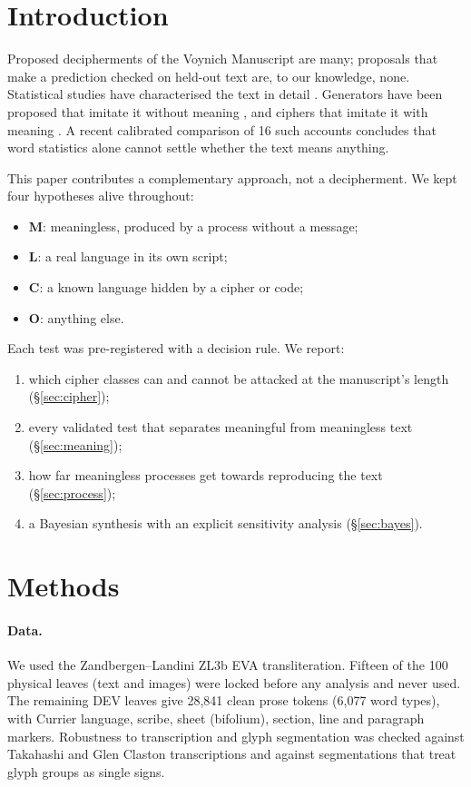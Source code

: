 \documentclass[11pt,a4paper]{article}
\begin{document}
\section{Introduction}
Proposed decipherments of the Voynich Manuscript are many; proposals that make a prediction checked on held-out text are, to our knowledge, none. Statistical studies have characterised the text in detail \citep{montemurro2013keywords,sterneck2021topic,gaskell2022gibberish,bowern2022enciphered,zattera2022slot,rozanova2026units,parisel2026currier,parisel2026layered}. Generators have been proposed that imitate it without meaning \citep{timm2019generating,quimqu2026scribe}, and ciphers that imitate it with meaning \citep{greshko2025naibbe,hermes2022polygraphia}. A recent calibrated comparison of 16 such accounts \citep{zhang2026voynich} concludes that word statistics alone cannot settle whether the text means anything.

This paper contributes a complementary approach, not a decipherment. We kept four hypotheses alive throughout:
\begin{itemize}
\item \textbf{M}: meaningless, produced by a process without a message;
\item \textbf{L}: a real language in its own script;
\item \textbf{C}: a known language hidden by a cipher or code;
\item \textbf{O}: anything else.
\end{itemize}
Each test was pre-registered with a decision rule. We report:
\begin{enumerate}
\item which cipher classes can and cannot be attacked at the manuscript's length (\S\ref{sec:cipher});
\item every validated test that separates meaningful from meaningless text (\S\ref{sec:meaning});
\item how far meaningless processes get towards reproducing the text (\S\ref{sec:process});
\item a Bayesian synthesis with an explicit sensitivity analysis (\S\ref{sec:bayes}).
\end{enumerate}

\section{Methods}
\paragraph{Data.} We used the Zandbergen--Landini ZL3b EVA transliteration. Fifteen of the 100 physical leaves (text and images) were locked before any analysis and never used. The remaining DEV leaves give 28{,}841 clean prose tokens (6{,}077 word types), with Currier language, scribe, sheet (bifolium), section, line and paragraph markers. Robustness to transcription and glyph segmentation was checked against Takahashi and Glen Claston transcriptions and against segmentations that treat glyph groups as single signs.
\end{document}
